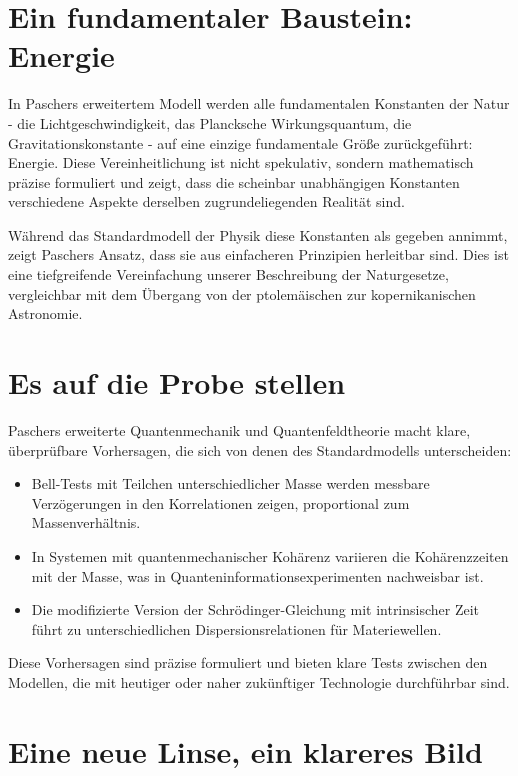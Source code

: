 \documentclass[a4paper,12pt]{article}
\begin{document}
	\section{Ein fundamentaler Baustein: Energie}
	
	In Paschers erweitertem Modell werden alle fundamentalen Konstanten der Natur - die Lichtgeschwindigkeit, das Plancksche Wirkungsquantum, die Gravitationskonstante - auf eine einzige fundamentale Größe zurückgeführt: Energie. Diese Vereinheitlichung ist nicht spekulativ, sondern mathematisch präzise formuliert und zeigt, dass die scheinbar unabhängigen Konstanten verschiedene Aspekte derselben zugrundeliegenden Realität sind.
	
	Während das Standardmodell der Physik diese Konstanten als gegeben annimmt, zeigt Paschers Ansatz, dass sie aus einfacheren Prinzipien herleitbar sind. Dies ist eine tiefgreifende Vereinfachung unserer Beschreibung der Naturgesetze, vergleichbar mit dem Übergang von der ptolemäischen zur kopernikanischen Astronomie.
	
	\section{Es auf die Probe stellen}
	
	Paschers erweiterte Quantenmechanik und Quantenfeldtheorie macht klare, überprüfbare Vorhersagen, die sich von denen des Standardmodells unterscheiden:
	
	\begin{itemize}
		\item Bell-Tests mit Teilchen unterschiedlicher Masse werden messbare Verzögerungen in den Korrelationen zeigen, proportional zum Massenverhältnis.
		\item In Systemen mit quantenmechanischer Kohärenz variieren die Kohärenzzeiten mit der Masse, was in Quanteninformationsexperimenten nachweisbar ist.
		\item Die modifizierte Version der Schrödinger-Gleichung mit intrinsischer Zeit führt zu unterschiedlichen Dispersionsrelationen für Materiewellen.
	\end{itemize}
	
	Diese Vorhersagen sind präzise formuliert und bieten klare Tests zwischen den Modellen, die mit heutiger oder naher zukünftiger Technologie durchführbar sind.
	
	\section{Eine neue Linse, ein klareres Bild}
	
\end{document}
